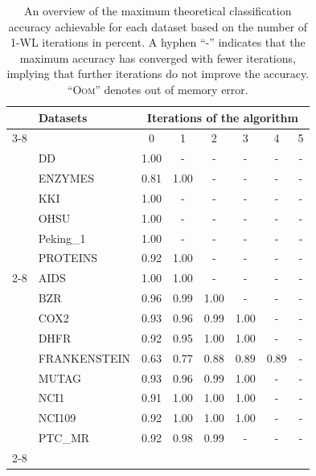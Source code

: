 \begin{table}[H]
	\caption{An overview of the maximum theoretical classification accuracy achievable for each dataset based on the number of 1-WL iterations in percent. A hyphen ``-'' indicates that the maximum accuracy has converged with fewer iterations, implying that further iterations do not improve the accuracy. ``\textsc{Oom}'' denotes out of memory error.}
    \centering
	\label{tab:max_accuracies_app}
	\begin{tabular}{@{}c <{\enspace}@{}lcccccc@{}}	\toprule
			& \multirow{3}{*}{\vspace*{4pt}\textbf{Datasets}}&\multicolumn{6}{c}{\textbf{Iterations of the \wl algorithm}}\\\cmidrule{3-8}
			& & {0}  & {1}  & {2}  & {3} & {4}  & {5}
			\\
			\toprule

			\multirow{4}{*}{\rotatebox{90}{Bioinformatics}}
            & DD &1.00 & - & - & - & - & - \\
            & ENZYMES &0.81 & 1.00 & - & - & - & - \\
            & KKI & 1.00 & - & - & - & - & - \\
            & OHSU & 1.00 & - & - & - & - & - \\
            & Peking\_1 & 1.00 & - & - & - & - & - \\
            & PROTEINS &0.92 & 1.00 & - & - & - & -\\


            \cmidrule{2-8}
            \multirow{9}{*}{\rotatebox{90}{Small molecules}}
            & AIDS & 1.00 & 1.00 & - & - & - & - \\
            & BZR & 0.96 & 0.99 & 1.00 & - & - & - \\
            & COX2 & 0.93 & 0.96 & 0.99 & 1.00 & - & - \\
            & DHFR & 0.92 & 0.95 & 1.00 & 1.00 & - & - \\
            & FRANKENSTEIN & 0.63 & 0.77 & 0.88 & 0.89 & 0.89 & - \\
            & MUTAG &0.93 & 0.96 & 0.99 & 1.00 & - & - \\
            & NCI1 &0.91 & 1.00 & 1.00 & 1.00 & - & - \\
            & NCI109 & 0.92 & 1.00 & 1.00 & 1.00 & - & - \\
            & PTC\_MR &0.92 & 0.98 & 0.99 & - & - & - \\
            \cmidrule{2-8}


\end{tabular}
\end{table}
